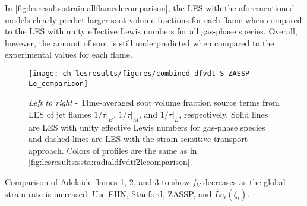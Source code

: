 In \cref{fig:lesresults:strain:allflameslecomparison}, the LES with the aforementioned models clearly predict larger soot volume fractions for each flame when compared to the LES with unity effective Lewis numbers for all gas-phase species. Overall, however, the amount of soot is still underpredicted when compared to the experimental values for each flame. 

\begin{figure}[htb]
  \centering
  \texttt{[image: ch-lesresults/figures/combined-dfvdt-S-ZASSP-Le\_comparison]}
  \caption[Centerline \texorpdfstring{$\langle df_V/dt \rangle$}{<dfV/dt>} from LES of Flames \texorpdfstring{$1/\tau|_H$}{1/t|H}, \texorpdfstring{$1/\tau|_M$}{1/t|M}, and \texorpdfstring{$1/\tau|_L$}{1/t|L} with Various Transport Approaches]{\textit{Left to right} - Time-averaged soot volume fraction source terms from LES of jet flames $1/\tau|_H$, $1/\tau|_M$, and $1/\tau|_L$, respectively. Solid lines are LES with unity effective Lewis numbers for gas-phase species and dashed lines are LES with the strain-sensitive transport approach. Colors of profiles are the same as in \cref{fig:lesresults:ssta:radialdfvdtf2lecomparison}.}
  \label{fig:lesresults:strain:allflamesdfvdt}
\end{figure}

Comparison of Adelaide flames 1, 2, and 3 to show $f_V$ decreases as the global strain rate is increased. Use EHN, Stanford, ZASSP, and $\check{Le}_i(\zeta_i)$.
